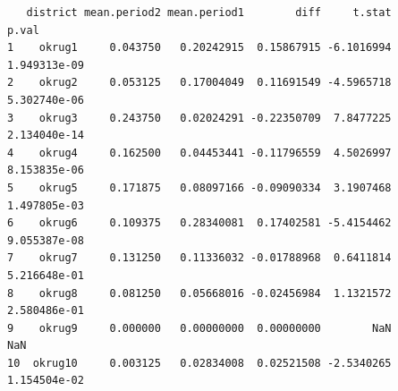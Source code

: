 \documentclass[
  letterpaper,
  DIV=11,
  numbers=noendperiod]{scrartcl}
\newenvironment{Shaded}{\begin{snugshade}}{\end{snugshade}}
\newcommand{\AttributeTok}[1]{\textcolor[rgb]{0.40,0.45,0.13}{#1}}
\newcommand{\ConstantTok}[1]{\textcolor[rgb]{0.56,0.35,0.01}{#1}}
\newcommand{\ControlFlowTok}[1]{\textcolor[rgb]{0.00,0.23,0.31}{\textbf{#1}}}
\newcommand{\DecValTok}[1]{\textcolor[rgb]{0.68,0.00,0.00}{#1}}
\newcommand{\FloatTok}[1]{\textcolor[rgb]{0.68,0.00,0.00}{#1}}
\newcommand{\FunctionTok}[1]{\textcolor[rgb]{0.28,0.35,0.67}{#1}}
\newcommand{\NormalTok}[1]{\textcolor[rgb]{0.00,0.23,0.31}{#1}}
\newcommand{\OtherTok}[1]{\textcolor[rgb]{0.00,0.23,0.31}{#1}}
\newcommand{\SpecialCharTok}[1]{\textcolor[rgb]{0.37,0.37,0.37}{#1}}
\newcommand{\StringTok}[1]{\textcolor[rgb]{0.13,0.47,0.30}{#1}}
\begin{document}
\begin{Shaded}
\end{Shaded}

\begin{verbatim}
   district mean.period2 mean.period1        diff     t.stat        p.val
1    okrug1     0.043750   0.20242915  0.15867915 -6.1016994 1.949313e-09
2    okrug2     0.053125   0.17004049  0.11691549 -4.5965718 5.302740e-06
3    okrug3     0.243750   0.02024291 -0.22350709  7.8477225 2.134040e-14
4    okrug4     0.162500   0.04453441 -0.11796559  4.5026997 8.153835e-06
5    okrug5     0.171875   0.08097166 -0.09090334  3.1907468 1.497805e-03
6    okrug6     0.109375   0.28340081  0.17402581 -5.4154462 9.055387e-08
7    okrug7     0.131250   0.11336032 -0.01788968  0.6411814 5.216648e-01
8    okrug8     0.081250   0.05668016 -0.02456984  1.1321572 2.580486e-01
9    okrug9     0.000000   0.00000000  0.00000000        NaN          NaN
10  okrug10     0.003125   0.02834008  0.02521508 -2.5340265 1.154504e-02
\end{verbatim}
\end{document}
